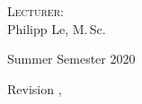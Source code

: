\begin{titlepage}
\begin{center}
		\vspace{0.75cm}

		\normalsize
		\textsc{Lecturer:} \\
		Philipp Le, M.\,Sc.
		
		\vspace{0.75cm}
		
		\normalsize
		Summer Semester 2020
	\end{center}

	\vfill
	
	\begin{flushright}
		\footnotesize
		Revision \therevision, \therevisiondate
	\end{flushright}
\end{titlepage}


